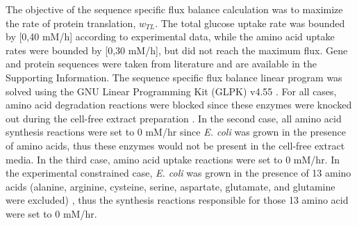 \documentclass[journal=asbcd6,manuscript=article]{achemso}
\begin{document}
The objective of the sequence specific flux balance calculation was to maximize the rate of protein translation, $w_{TL}$.
The total glucose uptake rate was bounded by [0,40 mM/h] according to experimental data, while the amino acid uptake rates were bounded by [0,30 mM/h], but did not reach the maximum flux.
Gene and protein sequences were taken from literature and are available in the Supporting Information.
The sequence specific flux balance linear program was solved using the GNU Linear Programming Kit (GLPK) v4.55 \cite{GLPK}.
For all cases, amino acid degradation reactions were blocked since these enzymes were knocked out during the cell-free extract preparation \cite{2005_calhoun_BiotechnologyProgress, Garamella:2016aa}.
In the second case, all amino acid synthesis reactions were set to 0 mM/hr since \textit{E. coli} was grown in the presence of amino acids, thus these enzymes would not be present in the cell-free extract media.
In the third case, amino acid uptake reactions were set to 0 mM/hr.
In the experimental constrained case, \textit{E. coli} was grown in the presence of 13 amino acids (alanine, arginine, cysteine, serine, aspartate, glutamate, and glutamine were excluded) \cite{Zawada:2003}, thus the synthesis reactions responsible for those 13 amino acid were set to 0 mM/hr.
\end{document}
